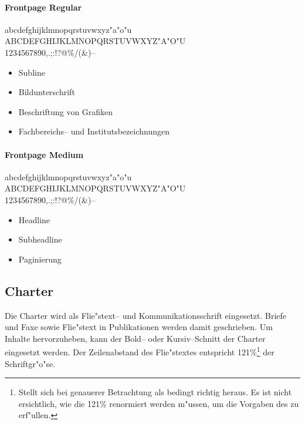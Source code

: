 \documentclass[twoside,colorback,accentcolor=tud4c,11pt]{tudreport}
\begin{document}
    \paragraph{Frontpage Regular}
      \hfill%
      \begin{minipage}{\textwidth-\the\parindent}
        \sublinefont\normalsize
        \noindent
        abcdefghijklmnopqrstuvwxyz"a"o"u\\
        ABCDEFGHIJKLMNOPQRSTUVWXYZ"A"O"U\\
        1234567890,.;:!?\glqq\grqq{}@\texteuro\%/(\&)--
      \end{minipage}
      \begin{itemize}
        \item Subline
        \item Bildunterschrift
        \item Beschriftung von Grafiken
        \item Fachbereichs-- und Institutsbezeichnungen
      \end{itemize}

    \paragraph{Frontpage Medium}
      \hfill%
      \begin{minipage}{\textwidth-\the\parindent}
        \headfont\normalsize
        \noindent
        abcdefghijklmnopqrstuvwxyz"a"o"u\\
        ABCDEFGHIJKLMNOPQRSTUVWXYZ"A"O"U\\
        1234567890,.;:!?\glqq\grqq{}@\texteuro\%/(\&)--
      \end{minipage}
      \begin{itemize}
        \item Headline
        \item Subheadline
        \item Paginierung
      \end{itemize}

  \subsection{Charter}
    Die Charter wird als Flie"stext-- und Kommunikationsschrift eingesetzt.
    Briefe und Faxe sowie Flie"stext in Publikationen werden damit geschrieben.
    Um Inhalte hervorzuheben, kann der Bold-- oder Kursiv--Schnitt der Charter eingesetzt werden.
    Der Zeilenabstand des Flie"stextes entspricht 121\%\footnote{Stellt sich bei genauerer 
    Betrachtung als bedingt richtig heraus. Es ist nicht ersichtlich, wie die 121\%
    renormiert werden m"ussen, um die Vorgaben des  zu
    erf"ullen.} der Schriftgr"o"se.
\end{document}
